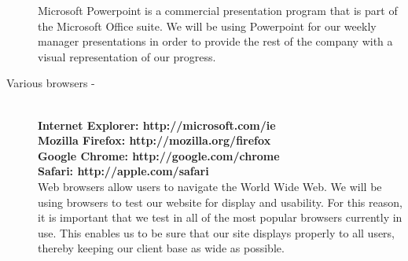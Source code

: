 \begin{description}
			Microsoft Powerpoint is a commercial presentation program that is part of the Microsoft Office suite. We will be using Powerpoint for our weekly manager presentations in order to provide the rest of the company with a visual representation of our progress.
		\item[Various browsers -] \hfill \\
		\textbf{Internet Explorer: http://microsoft.com/ie \\Mozilla Firefox: http://mozilla.org/firefox \\Google Chrome: http://google.com/chrome \\Safari: http://apple.com/safari}\\
			Web browsers allow users to navigate the World Wide Web. We will be using browsers to test our website for display and usability. For this reason, it is important that we test in all of the most popular browsers currently in use. This enables us to be sure that our site displays properly to all users, thereby keeping our client base as wide as possible.
			
	\end{description}
